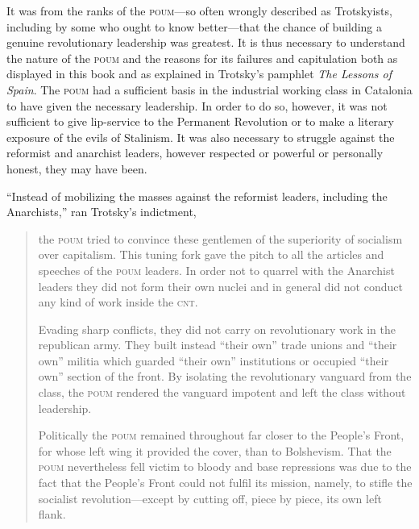 It was from the ranks of the \textsc{poum}---so often wrongly described as Trotskyists, including by some who ought to know better---that the chance of building a genuine revolutionary leadership was greatest. It is thus necessary to understand the nature of the \textsc{poum} and the reasons for its failures and capitulation both as displayed in this book and as explained in Trotsky’s pamphlet \emph{The Lessons of Spain}. The \textsc{poum} had a sufficient basis in the industrial working class in Catalonia to have given the necessary leadership. In order to do so, however, it was not sufficient to give lip-service to the Permanent Revolution or to make a literary exposure of the evils of Stalinism. It was also necessary to struggle against the reformist and anarchist leaders, however respected or powerful or personally honest, they may have been.

``Instead of mobilizing the masses against the reformist leaders, including the Anarchists,'' ran Trotsky’s indictment,

\begin{quotation}
  \noindent
  the \textsc{poum} tried to convince these gentlemen of the superiority of socialism over capitalism. This tuning fork gave the pitch to all the articles and speeches of the \textsc{poum} leaders. In order not to quarrel with the Anarchist leaders they did not form their own nuclei and in general did not conduct any kind of work inside the \textsc{cnt}.
  
  Evading sharp conflicts, they did not carry on revolutionary work in the republican army. They built instead ``their own'' trade unions and ``their own'' militia which guarded ``their own'' institutions or occupied ``their own'' section of the front. By isolating the revolutionary vanguard from the class, the \textsc{poum} rendered the vanguard impotent and left the class without leadership.
  
  Politically the \textsc{poum} remained throughout far closer to the People’s Front, for whose left wing it provided the cover, than to Bolshevism. That the \textsc{poum} nevertheless fell victim to bloody and base repressions was due to the fact that the People’s Front could not fulfil its mission, namely, to stifle the socialist revolution---except by cutting off, piece by piece, its own left flank.
\end{quotation}

